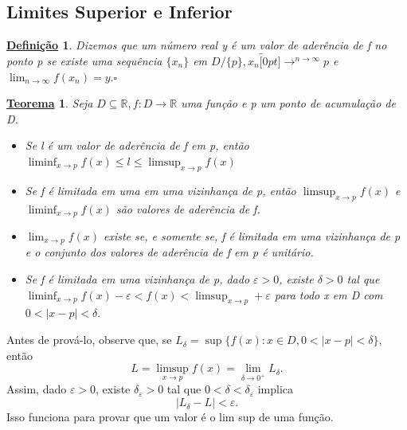 \documentclass{article}
\newtheorem*{def*}{\underline{Defini\c c\~ao}}
\newtheorem*{theorem*}{\underline{Teorema}}
\begin{document}
\subsection{Limites Superior e Inferior}
\begin{def*}
  Dizemos que um n\'umero real y \'e um valor de ader\^encia de f no ponto p se existe uma sequ\^encia $\{x_{n}\}$
em $D/\{p\}, x_{n}\overbracket[0pt]{\longrightarrow}^{n\to \infty}p$ e $\lim_{n\to\infty}f(x_{n}) = y.\square$
\end{def*}
\begin{theorem*}
  Seja $D\subseteq{\mathbb{R}}, f:D\rightarrow \mathbb{R}$ uma fun\c c\~ao e p um ponto de acumula\c c\~ao de D.
 \begin{itemize}
   \item[1)] Se l \'e um valor de ader\^encia de f em p, ent\~ao $\liminf_{x\to p}f(x) \leq{l}\leq{\limsup_{x\to p}f(x)}$
    \item[2)] Se f \'e limitada em uma em uma vizinhan\c ca de p, ent\~ao $\limsup_{x\to p}f(x)$ e
    $\liminf_{x\to p}f(x)$ s\~ao valores de ader\^encia de f.
    \item[3)] $\lim_{x\to p}f(x)$ existe se, e somente se, f \'e limitada em uma vizinhan\c ca de p e o conjunto dos
    valores de ader\^encia de f em p \'e unit\'ario.
    \item[4)] Se f \'e limitada em uma vizinhan\c ca de p, dado $\varepsilon > 0$, existe $\delta > 0$ tal que 
      $\liminf_{x\to p}f(x) - \varepsilon < f(x) < \limsup_{x\to p} + \varepsilon$ para todo x em D com $0<|x-p|<\delta.$ 
 \end{itemize}
\end{theorem*}
Antes de prov\'a-lo, observe que, se $L_{\delta} = \sup\{f(x):x\in D, 0 < |x-p| < \delta\},$ ent\~ao 
 $$
    L = \limsup_{x\to p}f(x) = \lim_{\delta\to 0^{+}}L_{\delta}.
 $$
 Assim, dado $\varepsilon > 0$, existe $\delta_{\varepsilon}>0$ tal que $0 < \delta < \delta_{\varepsilon}$ implica 
   $$
     |L_{\delta}-L|< \varepsilon.
   $$
  Isso funciona para provar que um valor \'e o lim sup de uma fun\c c\~ao.
\end{document}
